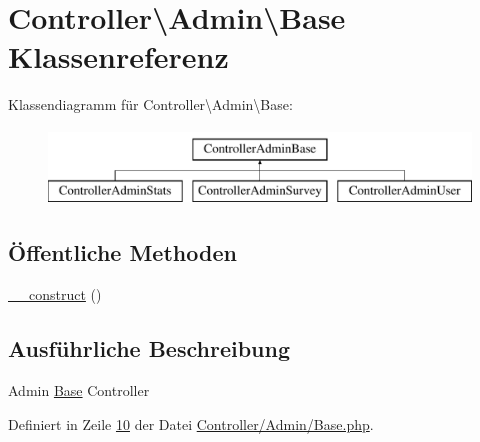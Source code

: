 \hypertarget{class_controller_1_1_admin_1_1_base}{\section{Controller\textbackslash{}Admin\textbackslash{}Base Klassenreferenz}
\label{class_controller_1_1_admin_1_1_base}
}
Klassendiagramm für Controller\textbackslash{}Admin\textbackslash{}Base\-:\begin{figure}[H]
\begin{center}
\leavevmode
\includegraphics[height=2.000000cm]{class_controller_1_1_admin_1_1_base}
\end{center}
\end{figure}
\subsection*{Öffentliche Methoden}
\begin{DoxyCompactItemize}
\item 
\hyperlink{class_controller_1_1_admin_1_1_base_a7e433734833c21c222186860f4cd8ce5}{\-\_\-\-\_\-construct} ()
\end{DoxyCompactItemize}


\subsection{Ausführliche Beschreibung}
Admin \hyperlink{class_controller_1_1_admin_1_1_base}{Base} Controller 

Definiert in Zeile \hyperlink{_controller_2_admin_2_base_8php_source_l00010}{10} der Datei \hyperlink{_controller_2_admin_2_base_8php_source}{Controller/\-Admin/\-Base.\-php}.



